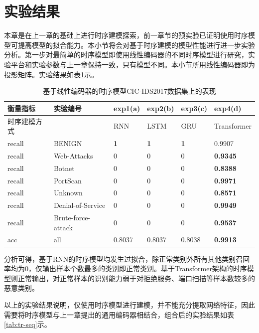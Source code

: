\section{实验结果}
本章是在上一章的基础上进行时序建模探索，前一章节的预实验已证明使用时序模型可提高模型的拟合能力。本小节将会对基于时序建模的模型性能进行进一步实验分析。第一步对最简单的时序模型即使用线性编码器的不同时序模型进行研究，实验平台和实验参数与上一章保持一致，只有模型不同。本小节所用线性编码器即为投影矩阵。实验结果如表\ref{tab:none-seq}示。
\begin{table}[!ht]
    \centering
    \caption{基于线性编码器的时序模型CIC-IDS2017数据集上的表现}
    \begin{adjustbox}{max width=.75\textwidth}
    \begin{tabular}{llllll}
    \toprule
        衡量指标 & 实验编号 & exp1(a) & exp2(b)  & exp3(c) & exp4(d)\\ \midrule
        时序建模方式 & ~ & RNN & LSTM & GRU  & Transformer  \\ 
        recall & BENIGN & \textbf{1} & \textbf{1} & \textbf{1} & 0.9907 \\
        recall & Web-Attacks & 0 & 0 & 0 & \textbf{0.9345} \\
        recall & Botnet & 0 & 0 & 0 & \textbf{0.8388} \\
        recall & PortScan & 0 & 0 & 0 & \textbf{0.9971} \\
        recall & Unknown & 0 & 0 & 0 & \textbf{0.8571} \\
        recall & Denial-of-Service & 0 & 0 & 0 & \textbf{0.9949} \\
        recall & Brute-force-attack & 0 & 0 & 0 & \textbf{0.9537} \\
        acc & all & 0.8037 & 0.8037 & 0.8038 & \textbf{0.9913} \\

    \bottomrule
    \end{tabular}
    \end{adjustbox}
    \label{tab:none-seq}
\end{table}

分析可得，基于RNN的时序模型均发生过拟合，除正常类别外所有其他类别召回率均为0，仅输出样本个数最多的类别即正常类别。基于Transformer架构的时序模型则正常输出，对正常样本的识别能力弱于对拒绝服务、端口扫描等样本数较多的恶意类别。

以上的实验结果说明，仅使用时序模型进行建模，并不能充分提取网络特征，因此需要将时序模型与上一章提出的通用编码器相结合，组合后的实验结果如表\ref{tab:tr-seq}示。

